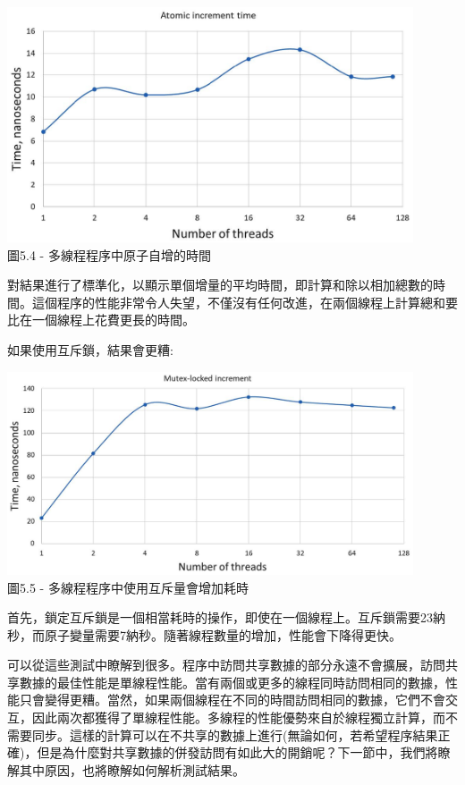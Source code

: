 \begin{center}
\includegraphics[width=0.9\textwidth]{content/1/chapter5/images/4.jpg}\\
圖5.4 - 多線程程序中原子自增的時間
\end{center}

對結果進行了標準化，以顯示單個增量的平均時間，即計算和除以相加總數的時間。這個程序的性能非常令人失望，不僅沒有任何改進，在兩個線程上計算總和要比在一個線程上花費更長的時間。

如果使用互斥鎖，結果會更糟:

\begin{center}
\includegraphics[width=0.9\textwidth]{content/1/chapter5/images/5.jpg}\\
圖5.5 - 多線程程序中使用互斥量會增加耗時
\end{center}

首先，鎖定互斥鎖是一個相當耗時的操作，即使在一個線程上。互斥鎖需要23納秒，而原子變量需要7納秒。隨著線程數量的增加，性能會下降得更快。

可以從這些測試中瞭解到很多。程序中訪問共享數據的部分永遠不會擴展，訪問共享數據的最佳性能是單線程性能。當有兩個或更多的線程同時訪問相同的數據，性能只會變得更糟。當然，如果兩個線程在不同的時間訪問相同的數據，它們不會交互，因此兩次都獲得了單線程性能。多線程的性能優勢來自於線程獨立計算，而不需要同步。這樣的計算可以在不共享的數據上進行(無論如何，若希望程序結果正確)，但是為什麼對共享數據的併發訪問有如此大的開銷呢？下一節中，我們將瞭解其中原因，也將瞭解如何解析測試結果。








